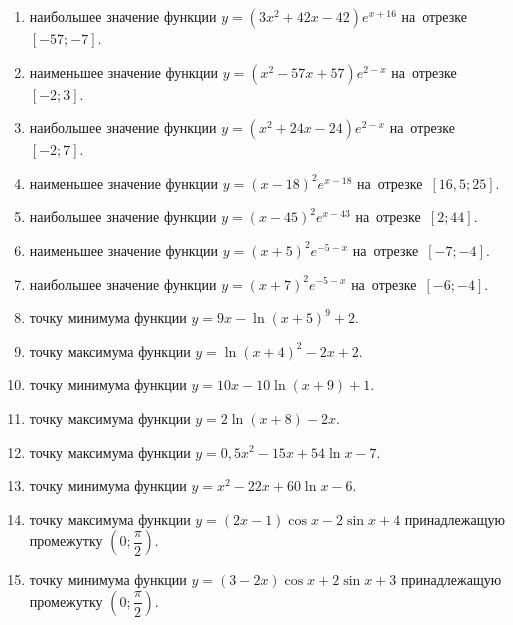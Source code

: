 \documentclass[a4paper,10pt]{article}
\begin{document}
\begin{enumerate}
\item {} наибольшее значение функции $y=\left(3x^2 +42x -42\right)e^{x+16}$ на~отрезке~$\left[-57;-7\right]$.

\item {} наименьшее значение функции $y=\left(x^2 -57x +57\right)e^{2-x}$ на~отрезке~$\left[-2;3\right]$.

\item {} наибольшее значение функции $y=\left(x^2 +24x -24\right)e^{2-x}$ на~отрезке~$\left[-2;7\right]$.

\item {} наименьшее значение функции $y=\left(x-18\right)^2e^{x-18}$ на~отрезке~$\left[16,5;25\right]$.

\item {} наибольшее значение функции $y=\left(x-45\right)^2e^{x-43}$ на~отрезке~$\left[2;44\right]$.

\item {} наименьшее значение функции $y=\left(x+5\right)^2e^{-5-x}$ на~отрезке~$\left[-7;-4\right]$.

\item {} наибольшее значение функции $y=\left(x+7\right)^2e^{-5-x}$ на~отрезке~$\left[-6;-4\right]$.

\item {} точку минимума функции $y=9x-\ln\left(x+5\right)^{9}+2$.

\item {} точку максимума функции $y=\ln\left(x+4\right)^{2}-2x+2$.

\item {} точку минимума функции $y=10x-10\ln\left(x+9\right)+1$.

\item {} точку максимума функции $y=2\ln\left(x+8\right)-2x$.

\item {} точку максимума функции $y=0,5x^2-15x+54\ln x -7$.

\item {} точку минимума функции $y=x^2-22x+60\ln x -6$.

\item {} точку максимума функции $y=\left(2x-1\right)\cos x -2\sin x+4$
принадлежащую промежутку $\left(0;\dfrac{\pi}{2}\right)$.

\item {} точку минимума функции $y=\left(3-2x\right)\cos x +2\sin x+3$
принадлежащую промежутку $\left(0;\dfrac{\pi}{2}\right)$.


\end{enumerate}
\end{document}
